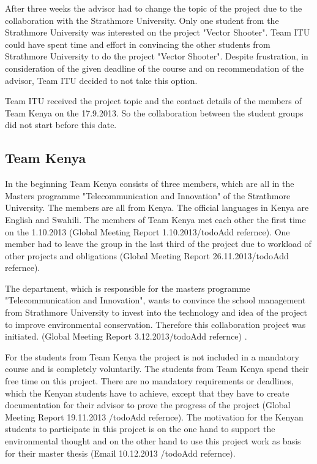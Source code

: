 After three weeks the advisor had to change the topic of the project due to the collaboration with the Strathmore University. Only one student from the Strathmore University was interested on the project "Vector Shooter". Team ITU could have spent time and effort in convincing the other students from Strathmore University to do the project "Vector Shooter". Despite frustration, in consideration of the given deadline of the course and on recommendation of the advisor, Team ITU decided to not take this option.

Team ITU received the project topic and the contact details of the members of Team Kenya on the 17.9.2013. So the collaboration between the student groups did not start before this date.


\subsection{Team Kenya}

In the beginning Team Kenya consists of three members, which are all in the Masters programme "Telecommunication and Innovation" of the Strathmore University. The members are all from Kenya. The official languages in Kenya are English and Swahili. The members of Team Kenya met each other the first time on the 1.10.2013 (Global Meeting Report 1.10.2013/todo{Add refernce}). One member had to leave the group in the last third of the project due to workload of other projects and obligations (Global Meeting Report 26.11.2013/todo{Add refernce}).

The department, which is responsible for the masters programme "Telecommunication and Innovation", wants to convince the school management from Strathmore University to invest into the technology and idea of the project to improve environmental conservation. Therefore this collaboration project was initiated. (Global Meeting Report 3.12.2013/todo{Add refernce}) .

For the students from Team Kenya the project is not included in a mandatory course and is completely voluntarily. The students from Team Kenya spend their free time on this project. There are no mandatory requirements or deadlines, which the Kenyan students have to achieve, except that they have to create documentation for their advisor to prove the progress of the project (Global Meeting Report 19.11.2013 /todo{Add refernce}). The motivation for the Kenyan students to participate in this project is on the one hand to support the environmental thought and on the other hand to use this project work as basis for their master thesis (Email 10.12.2013 /todo{Add refernce}).

